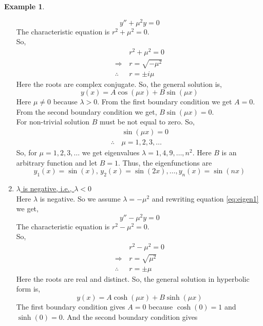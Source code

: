 \documentclass[12pt,a4paper]{article}
\theoremstyle{remark}
\theoremstyle{definition}
\newtheorem{ex}{Example}[section]
\begin{document}
\begin{ex}
\begin{enumerate}[label={Case \arabic*:}]
              \[
                  y''+\mu^2 y=0
              \]
              The characteristic equation is $ r^2+\mu^2=0 $.\\
              So,
              \begin{align*}
                                & r^2+\mu^2=0     \\
                  \Rightarrow\, & r=\sqrt{-\mu^2} \\
                  \therefore \, & r=\pm i\mu
              \end{align*}
              Here the roots are complex conjugate. So, the general solution is,
              \[
                  y(x)=A\cos(\mu x)+B\sin(\mu x)
              \]
              Here $ \mu\neq0 $ because $ \lambda>0 $. From the first boundary condition we get $ A=0 $. From the second boundary condition we get, $ B\sin(\mu x)=0 $.\\
              For non-trivial solution $ B $ must be not equal to zero. So,
              \begin{align*}
                               & \sin(\mu x)=0   \\
                  \therefore\, & \mu=1,2,3,\dots
              \end{align*}
              So, for $ \mu=1,2,3,\dots $ we get eigenvalues $ \lambda=1,4,9,\dots,n^2 $. Here $ B $ is an arbitrary function and let $ B=1 $. Thus, the eigenfunctions are
              \[
                  y_1(x)=\sin(x),\,y_2(x)=\sin(2x),\dots,y_n(x)=\sin(nx)
              \]
        \item \underline{$ \lambda $ is negative, i.e., $ \lambda <0 $}\\
              Here $ \lambda $ is negative. So we assume $ \lambda=-\mu^2 $ and rewriting equation \eqref{eq:eigen1} we get,
              \[
                  y''-\mu^2 y=0
              \]
              The characteristic equation is $ r^2-\mu^2=0 $.\\
              So,
              \begin{align*}
                                & r^2-\mu^2=0    \\
                  \Rightarrow\, & r=\sqrt{\mu^2} \\
                  \therefore \, & r=\pm \mu
              \end{align*}
              Here the roots are real and distinct. So, the general solution in hyperbolic form is,
              \[
                  y(x)=A\cosh(\mu x)+B\sinh(\mu x)
              \]
              The first boundary condition gives $ A=0 $ because $ \cosh(0)=1$ and $\sinh(0)=0 $. And the second boundary condition gives

\end{enumerate}
\end{ex}
\end{document}
